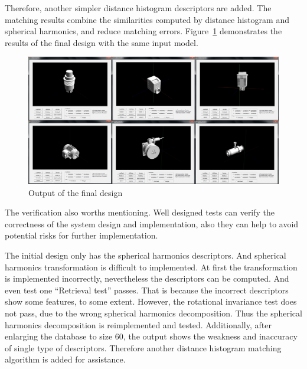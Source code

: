 Therefore, another simpler distance histogram  descriptors are added. The matching results combine the similarities computed by distance histogram and spherical harmonics, and reduce matching errors. Figure~\ref{output_finaldesign} demonstrates the results of the final design with the same input model.

\begin{figure}[h]
\centering
\includegraphics[width=0.7\linewidth]{output_finaldesign}
\caption{Output of the final design} \label{output_finaldesign}
\end{figure}

The verification also worths mentioning. Well designed tests can verify the correctness of the system design and implementation, also they can help to avoid potential risks for further implementation. 

The initial design only has the spherical harmonics descriptors. And spherical harmonics transformation is difficult to implemented. At first the transformation is implemented incorrectly, nevertheless the descriptors can be computed. And even test one ``Retrieval test'' passes. That is because the incorrect descriptors show some features, to some extent. However, the rotational invariance test does not pass, due to the wrong spherical harmonics decomposition. Thus the spherical harmonics decomposition is reimplemented and tested. 
Additionally, after enlarging the database to size 60, the output shows the weakness and inaccuracy of single type of descriptors. Therefore another distance histogram matching algorithm is added for assistance.

